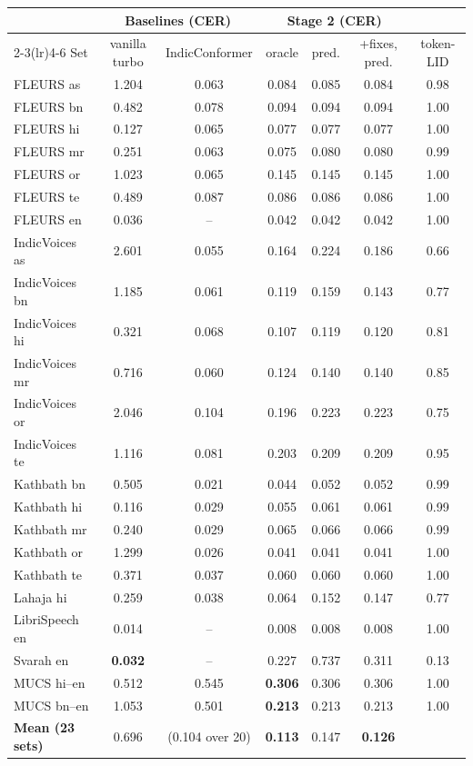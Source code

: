 \begin{center}
\small
\begin{tabular}{lcccccc}
\toprule
 & \multicolumn{2}{c}{Baselines (CER)} & \multicolumn{3}{c}{Stage 2 (CER)} & \\
\cmidrule(lr){2-3}\cmidrule(lr){4-6}
Set & vanilla turbo & IndicConformer & oracle & pred. & +fixes, pred. & token-LID\\
\midrule
FLEURS as & 1.204 & 0.063 & 0.084 & 0.085 & 0.084 & 0.98\\
FLEURS bn & 0.482 & 0.078 & 0.094 & 0.094 & 0.094 & 1.00\\
FLEURS hi & 0.127 & 0.065 & 0.077 & 0.077 & 0.077 & 1.00\\
FLEURS mr & 0.251 & 0.063 & 0.075 & 0.080 & 0.080 & 0.99\\
FLEURS or & 1.023 & 0.065 & 0.145 & 0.145 & 0.145 & 1.00\\
FLEURS te & 0.489 & 0.087 & 0.086 & 0.086 & 0.086 & 1.00\\
FLEURS en & 0.036 & -- & 0.042 & 0.042 & 0.042 & 1.00\\
\midrule
IndicVoices as & 2.601 & 0.055 & 0.164 & 0.224 & 0.186 & 0.66\\
IndicVoices bn & 1.185 & 0.061 & 0.119 & 0.159 & 0.143 & 0.77\\
IndicVoices hi & 0.321 & 0.068 & 0.107 & 0.119 & 0.120 & 0.81\\
IndicVoices mr & 0.716 & 0.060 & 0.124 & 0.140 & 0.140 & 0.85\\
IndicVoices or & 2.046 & 0.104 & 0.196 & 0.223 & 0.223 & 0.75\\
IndicVoices te & 1.116 & 0.081 & 0.203 & 0.209 & 0.209 & 0.95\\
\midrule
Kathbath bn & 0.505 & 0.021 & 0.044 & 0.052 & 0.052 & 0.99\\
Kathbath hi & 0.116 & 0.029 & 0.055 & 0.061 & 0.061 & 0.99\\
Kathbath mr & 0.240 & 0.029 & 0.065 & 0.066 & 0.066 & 0.99\\
Kathbath or & 1.299 & 0.026 & 0.041 & 0.041 & 0.041 & 1.00\\
Kathbath te & 0.371 & 0.037 & 0.060 & 0.060 & 0.060 & 1.00\\
\midrule
Lahaja hi & 0.259 & 0.038 & 0.064 & 0.152 & 0.147 & 0.77\\
LibriSpeech en & 0.014 & -- & 0.008 & 0.008 & 0.008 & 1.00\\
Svarah en & \textbf{0.032} & -- & 0.227 & 0.737 & 0.311 & 0.13\\
MUCS hi--en & 0.512 & 0.545 & \textbf{0.306} & 0.306 & 0.306 & 1.00\\
MUCS bn--en & 1.053 & 0.501 & \textbf{0.213} & 0.213 & 0.213 & 1.00\\
\midrule
\textbf{Mean (23 sets)} & 0.696 & (0.104 over 20) & \textbf{0.113} & 0.147 & \textbf{0.126} & \\
\bottomrule
\end{tabular}
\end{center}

